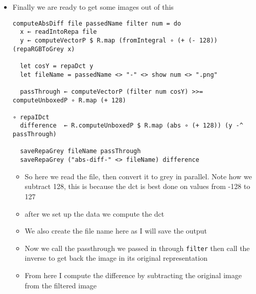 \documentclass{article}
\begin{document}
\begin{enumerate}
\begin{itemize}
\item Finally we are ready to get some images out of this
\begin{verbatim}
computeAbsDiff file passedName filter num = do
  x ← readIntoRepa file
  y ← computeVectorP $ R.map (fromIntegral ∘ (+ (- 128)) (repaRGBToGrey x)

  let cosY = repaDct y
  let fileName = passedName <> "-" <> show num <> ".png"

  passThrough ← computeVectorP (filter num cosY) >>= computeUnboxedP ∘ R.map (+ 128)
                                                                      ∘ repaIDct
  difference  ← R.computeUnboxedP $ R.map (abs ∘ (+ 128)) (y -^ passThrough)

  saveRepaGrey fileName passThrough
  saveRepaGrey ("abs-diff-" <> fileName) difference
\end{verbatim}
\begin{itemize}
\item So here we read the file, then convert it to grey in
parallel. Note how we subtract 128, this is because the dct is
best done on values from -128 to 127

\item after we set up the data we compute the dct

\item We also create the file name here as Ι will save the output

\item Now we call the passthrough we passed in through \texttt{filter} then
call the inverse to get back the image in its original representation

\item From here I compute the difference by subtracting the original
image from the filtered image


\end{itemize}
\end{itemize}
\end{enumerate}
\end{document}
